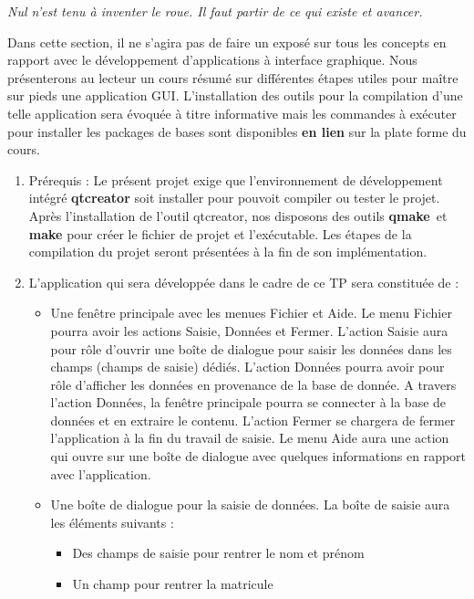 \documentclass[a4paper, oneside,11pt]{book}
\begin{document}
\begin{center}
\textit{Nul n'est tenu \`a inventer le roue. Il faut partir de ce qui existe et avancer.}
\end{center}

Dans cette section, il ne s'agira pas de faire un expos\'e sur tous les concepts en 
rapport avec le d\'eveloppement d'applications \`a interface graphique. Nous 
pr\'esenterons au lecteur un cours r\'esum\'e sur diff\'erentes \'etapes utiles pour 
ma\^itre sur pieds une application GUI. L'installation des outils pour la compilation 
d'une telle application sera \'evoqu\'ee \`a titre informative mais les commandes 
\`a ex\'ecuter pour installer les packages de bases sont disponibles \textbf{en lien}
sur la plate forme du cours. 
\begin{enumerate}
\item Pr\'erequis : Le pr\'esent projet exige que l'environnement de d\'eveloppement int\'egr\'e \textbf{qtcreator} soit installer pour pouvoit compiler ou tester le projet.
Apr\`es l'installation de l'outil qtcreator, nos disposons des outils \textbf{qmake}\
et \textbf{make} pour cr\'eer le fichier de projet et l'ex\'ecutable. Les \'etapes de 
la compilation du projet seront pr\'esent\'ees \`a la fin de son impl\'ementation. 
\item L'application qui sera d\'evelopp\'ee dans le cadre de ce TP sera constitu\'ee de :
\begin{itemize}
\item Une fen\^etre principale avec les menues Fichier et Aide. Le menu Fichier 
pourra avoir les actions Saisie, Donn\'ees et Fermer. L'action Saisie aura pour 
r\^ole d'ouvrir une bo\^ite de dialogue pour saisir les donn\'ees dans les champs
(champs de saisie) d\'edi\'es. L'action Donn\'ees pourra avoir pour r\^ole d'afficher 
les donn\'ees en provenance de la base de donn\'ee. 
A travers l'action Donn\'ees, la fen\^etre principale pourra se connecter \`a la base de donn\'ees et en extraire le contenu. L'action Fermer se chargera de fermer 
l'application \`a la fin du travail de saisie. Le menu Aide aura une action qui ouvre sur une bo\^ite de dialogue avec quelques informations en rapport avec l'application.
\item Une bo\^ite de dialogue pour la saisie de donn\'ees. La bo\^ite de saisie aura les \'el\'ements suivants :
\begin{itemize}
\item Des champs de saisie pour rentrer le nom et pr\'enom
\item Un champ pour rentrer la matricule

\end{itemize}
\end{itemize}
\end{enumerate}
\end{document}
